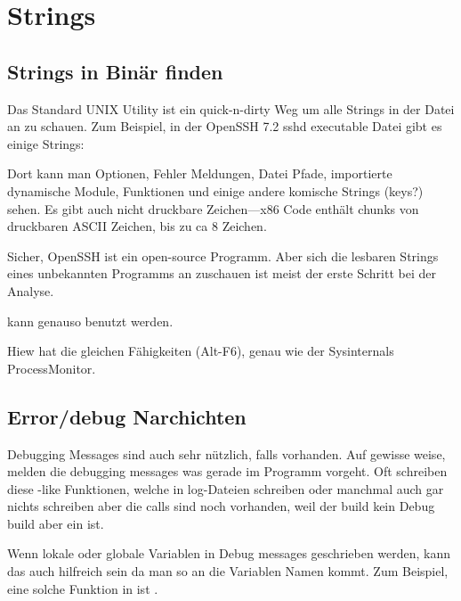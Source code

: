\section{Strings}
\label{sec:digging_strings}



\subsection{Strings in Binär finden}

Das Standard UNIX  Utility ist ein quick-n-dirty Weg um alle Strings in der 
Datei an zu schauen. Zum Beispiel, in der OpenSSH 7.2 sshd executable Datei gibt es einige Strings:



Dort kann man Optionen, Fehler Meldungen, Datei Pfade, importierte dynamische Module, Funktionen und einige andere komische 
Strings (keys?) sehen. Es gibt auch nicht druckbare Zeichen---x86 Code enthält chunks von druckbaren ASCII Zeichen, bis zu ca 8 Zeichen. %

Sicher, OpenSSH ist ein open-source Programm.
Aber sich die lesbaren Strings eines unbekannten Programms an zuschauen ist meist der erste Schritt bei 
der Analyse. 

 kann genauso benutzt werden.

Hiew hat die gleichen Fähigkeiten (Alt-F6), genau wie der Sysinternals ProcessMonitor.

\subsection{Error/debug Narchichten}

Debugging Messages sind auch sehr nützlich, falls vorhanden.
Auf gewisse weise, melden die debugging messages was gerade
im Programm vorgeht. Oft schreiben diese \printf-like Funktionen, welche
in log-Dateien schreiben oder manchmal auch gar nichts schreiben aber die 
calls sind noch vorhanden, weil der build kein Debug build aber ein  ist. %
\myindex{\oracle}

Wenn lokale oder globale Variablen in Debug messages geschrieben werden, kann das auch 
hilfreich sein da man so an die Variablen Namen kommt. %
Zum Beispiel, eine solche Funktion in \oracle ist .

